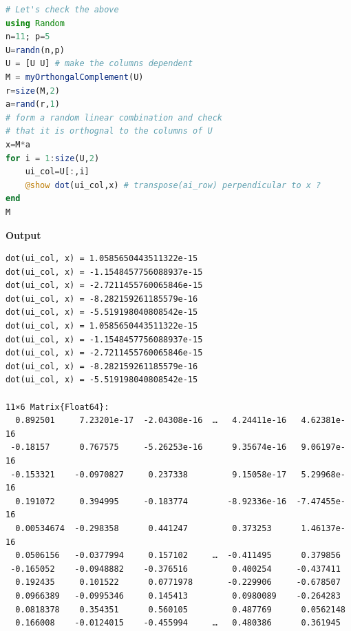 \begin{lstlisting}[language=Julia,style=mystyle]
# Let's check the above
using Random
n=11; p=5
U=randn(n,p)
U = [U U] # make the columns dependent
M = myOrthongalComplement(U)
r=size(M,2)
a=rand(r,1)
# form a random linear combination and check
# that it is orthognal to the columns of U
x=M*a
for i = 1:size(U,2)
    ui_col=U[:,i]
    @show dot(ui_col,x) # transpose(ai_row) perpendicular to x ?
end
M
\end{lstlisting}
\textbf{Output} 
\begin{verbatim}
dot(ui_col, x) = 1.0585650443511322e-15
dot(ui_col, x) = -1.1548457756088937e-15
dot(ui_col, x) = -2.7211455760065846e-15
dot(ui_col, x) = -8.282159261185579e-16
dot(ui_col, x) = -5.519198040808542e-15
dot(ui_col, x) = 1.0585650443511322e-15
dot(ui_col, x) = -1.1548457756088937e-15
dot(ui_col, x) = -2.7211455760065846e-15
dot(ui_col, x) = -8.282159261185579e-16
dot(ui_col, x) = -5.519198040808542e-15

11×6 Matrix{Float64}:
  0.892501     7.23201e-17  -2.04308e-16  …   4.24411e-16   4.62381e-16
 -0.18157      0.767575     -5.26253e-16      9.35674e-16   9.06197e-16
 -0.153321    -0.0970827     0.237338         9.15058e-17   5.29968e-16
  0.191072     0.394995     -0.183774        -8.92336e-16  -7.47455e-16
  0.00534674  -0.298358      0.441247         0.373253      1.46137e-16
  0.0506156   -0.0377994     0.157102     …  -0.411495      0.379856
 -0.165052    -0.0948882    -0.376516         0.400254     -0.437411
  0.192435     0.101522      0.0771978       -0.229906     -0.678507
  0.0966389   -0.0995346     0.145413         0.0980089    -0.264283
  0.0818378    0.354351      0.560105         0.487769      0.0562148
  0.166008    -0.0124015    -0.455994     …   0.480386      0.361945
\end{verbatim}






